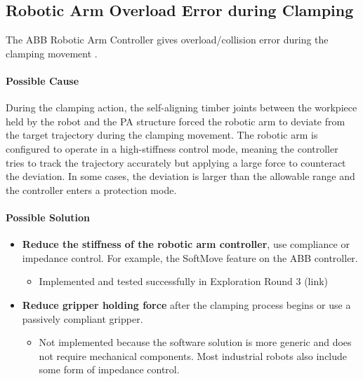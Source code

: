 \subsection{Robotic Arm Overload Error during Clamping}
\label{subsection:exploration-2-robotic-arm-overload-error-during-clamping}

The ABB Robotic Arm Controller gives overload/collision error during the  clamping movement .

\paragraph{Possible Cause}

During the clamping action, the self-aligning timber joints between the workpiece held by the robot and the PA structure forced the robotic arm to deviate from the target trajectory during the clamping movement. The robotic arm is configured to operate in a high-stiffness control mode, meaning the controller tries to track the trajectory accurately but applying a large force to counteract the deviation. In some cases, the deviation is larger than the allowable range and the controller enters a protection mode.

\paragraph{Possible Solution}

\begin{itemize}
    \item \textbf{Reduce the stiffness of the robotic arm controller}, use compliance or impedance control. For example, the SoftMove feature on the ABB controller.
    \begin{itemize}[nosep]
        \item Implemented and tested successfully in Exploration Round 3 (link)
    \end{itemize}
    \item \textbf{Reduce gripper holding force} after the clamping process begins or use a passively compliant gripper.
    \begin{itemize}[nosep]
        \item Not implemented because the software solution is more generic and does not require mechanical components. Most industrial robots also include some form of impedance control.
    \end{itemize}
\end{itemize}

